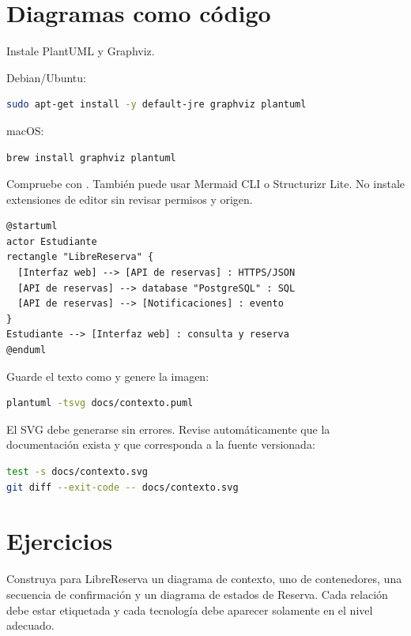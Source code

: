 \section{Diagramas como código}
\begin{instalacion}
Instale PlantUML y Graphviz.

Debian/Ubuntu:
\begin{lstlisting}[language=bash]
sudo apt-get install -y default-jre graphviz plantuml
\end{lstlisting}

macOS:
\begin{lstlisting}[language=bash]
brew install graphviz plantuml
\end{lstlisting}

Compruebe con . También puede usar Mermaid CLI o Structurizr Lite. No instale extensiones de editor sin revisar permisos y origen.
\end{instalacion}

\begin{lstlisting}
@startuml
actor Estudiante
rectangle "LibreReserva" {
  [Interfaz web] --> [API de reservas] : HTTPS/JSON
  [API de reservas] --> database "PostgreSQL" : SQL
  [API de reservas] --> [Notificaciones] : evento
}
Estudiante --> [Interfaz web] : consulta y reserva
@enduml
\end{lstlisting}

Guarde el texto como  y genere la imagen:
\begin{lstlisting}[language=bash]
plantuml -tsvg docs/contexto.puml
\end{lstlisting}

\begin{validacion}
El SVG debe generarse sin errores. Revise automáticamente que la documentación exista y que corresponda a la fuente versionada:
\begin{lstlisting}[language=bash]
test -s docs/contexto.svg
git diff --exit-code -- docs/contexto.svg
\end{lstlisting}
\end{validacion}

\section{Ejercicios}
\begin{ejercicio}[title={Ejercicio 1. Paquete mínimo de arquitectura}]
Construya para LibreReserva un diagrama de contexto, uno de contenedores, una secuencia de confirmación y un diagrama de estados de Reserva. Cada relación debe estar etiquetada y cada tecnología debe aparecer solamente en el nivel adecuado.
\end{ejercicio}

